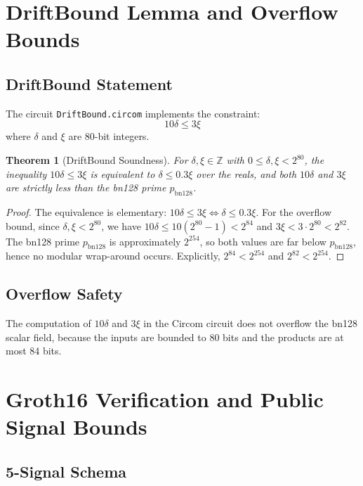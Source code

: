 \documentclass[11pt,a4paper]{article}
\newtheorem{theorem}{Theorem}
\theoremstyle{plain}
\begin{document}
\section{DriftBound Lemma and Overflow Bounds}

\subsection{DriftBound Statement}

The circuit \texttt{DriftBound.circom} implements the constraint:
\[
10\delta \leq 3\xi
\]
where $\delta$ and $\xi$ are 80-bit integers.

\begin{theorem}[DriftBound Soundness]
For $\delta, \xi \in \mathbb{Z}$ with $0 \leq \delta, \xi < 2^{80}$, the inequality $10\delta \leq 3\xi$ is equivalent to $\delta \leq 0.3\xi$ over the reals, and both $10\delta$ and $3\xi$ are strictly less than the bn128 prime $p_{\mathrm{bn128}}$.
\end{theorem}

\begin{proof}
The equivalence is elementary: $10\delta \leq 3\xi \iff \delta \leq 0.3\xi$. For the overflow bound, since $\delta, \xi < 2^{80}$, we have $10\delta \leq 10(2^{80}-1) < 2^{84}$ and $3\xi < 3\cdot 2^{80} < 2^{82}$. The bn128 prime $p_{\mathrm{bn128}}$ is approximately $2^{254}$, so both values are far below $p_{\mathrm{bn128}}$, hence no modular wrap-around occurs. Explicitly, $2^{84} < 2^{254}$ and $2^{82} < 2^{254}$.
\end{proof}

\subsection{Overflow Safety}

\begin{corollary}
The computation of $10\delta$ and $3\xi$ in the Circom circuit does not overflow the bn128 scalar field, because the inputs are bounded to 80 bits and the products are at most 84 bits.
\end{corollary}

\section{Groth16 Verification and Public Signal Bounds}

\subsection{5-Signal Schema}
\end{document}
